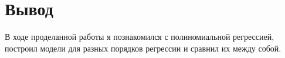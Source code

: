 \chapter{Вывод}
\label{ch:chap3}

В ходе проделанной работы я познакомился с полиномиальной регрессией, построил модели для разных порядков регрессии и сравнил их между собой.




\endinput
